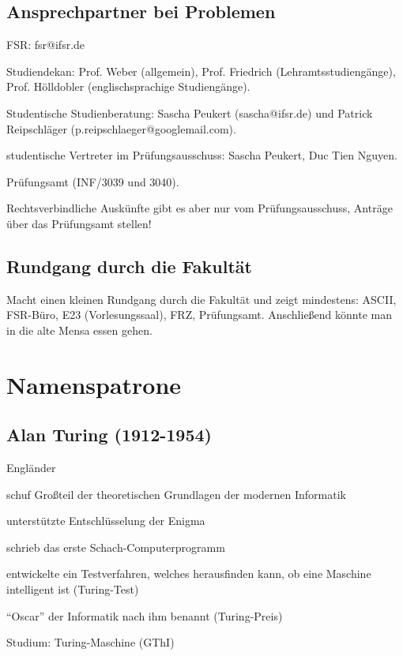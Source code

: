 \documentclass[a4paper,12pt]{report}
\begin{document}
\section{Ansprechpartner bei Problemen}
\begin{itemize*}
\item FSR: fsr@ifsr.de
\item Studiendekan: Prof. Weber (allgemein), Prof. Friedrich (Lehramtsstudiengänge), Prof. Hölldobler (englischsprachige Studiengänge).
\item Studentische Studienberatung: Sascha Peukert (sascha@ifsr.de) und Patrick Reipschläger (p.reipschlaeger@googlemail.com).
\item studentische Vertreter im Prüfungsausschuss: Sascha Peukert, Duc Tien Nguyen.
\item Prüfungsamt (INF/3039 und 3040).
\item Rechtsverbindliche Auskünfte gibt es aber nur vom Prüfungsausschuss, Anträge über das Prüfungsamt stellen!
\end{itemize*}

\section{Rundgang durch die Fakultät}
Macht einen kleinen Rundgang durch die Fakultät und zeigt mindestens: ASCII, FSR-Büro, E23 (Vorlesungssaal), FRZ, Prüfungsamt. Anschließend könnte man in die alte Mensa essen gehen.

\chapter{Namenspatrone}
\section{Alan Turing (1912-1954)}
\begin{itemize*}
\item Engländer
\item schuf Großteil der theoretischen Grundlagen der modernen Informatik
\item unterstützte Entschlüsselung der Enigma
\item schrieb das erste Schach-Computerprogramm
\item entwickelte ein Testverfahren, welches herausfinden kann, ob eine Maschine intelligent ist (Turing-Test)
\item ``Oscar'' der Informatik nach ihm benannt (Turing-Preis)
\item Studium: Turing-Maschine (GThI)
\end{itemize*}
\end{document}
